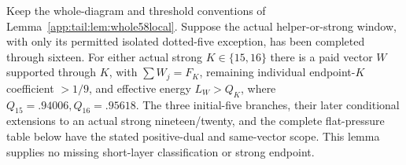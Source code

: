 \begin{lemma}
\label{app:tail:lem:whole58reference}
Keep the whole-diagram and threshold conventions of
Lemma~\ref{app:tail:lem:whole58local}. Suppose the actual helper-or-strong
window, with only its permitted isolated dotted-five exception, has
been completed through sixteen. For either actual strong
$K\in\{15,16\}$ there is a paid vector $W$ supported through $K$,
with $\sum W_j=F_K$, remaining individual endpoint-$K$ coefficient
$>1/9$, and effective energy $L_W>Q_K$, where
$Q_{15}=.94006,Q_{16}=.95618$. The three initial-five branches,
their later conditional extensions to an actual strong nineteen/twenty,
and the complete flat-pressure table below have the stated positive-dual
and same-vector scope. This lemma supplies no missing short-layer
classification or strong endpoint.
\end{lemma}
